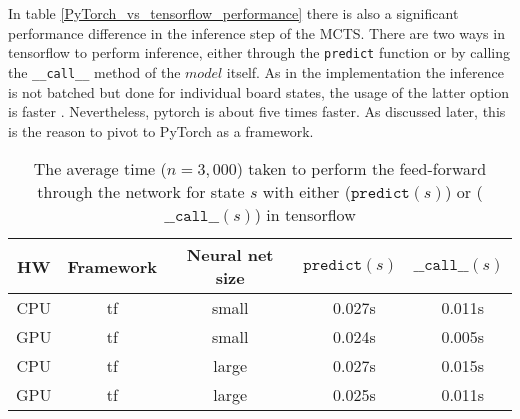 In table \ref{PyTorch_vs_tensorflow_performance} there is also a significant performance difference in the inference step of the MCTS. There are two ways in tensorflow to perform inference, either through the \texttt{predict} function or by calling the \texttt{\_\_call\_\_} method of the $model$ itself. As in the implementation the inference is not batched but done for individual board states, the usage of the latter option is faster \cite{noauthor_tfkerasmodel_nodate}. Nevertheless, pytorch is about five times faster. As discussed later, this is the reason to pivot to PyTorch as a framework.

\begin{table*}
    \begin{center}
        \begin{tabular}{ c|c|c|c|c }
            HW  & Framework & Neural net size & $\texttt{predict}(s)$ & $\texttt{\_\_call\_\_}(s)$ \\
            \hline
            \hline
            CPU & tf        & small           & ~0.027s               & ~0.011s                    \\
            GPU & tf        & small           & ~0.024s               & ~0.005s                    \\
            CPU & tf        & large           & ~0.027s               & ~0.015s                    \\
            GPU & tf        & large           & ~0.025s               & ~0.011s                    \\
        \end{tabular}
    \end{center}
    \caption{The average time ($n = 3,000$) taken to perform the feed-forward through the network for state $s$ with either ($\texttt{predict}(s)$) or ($\texttt{\_\_call\_\_}(s)$) in tensorflow}\label{tensorflow_predict_vs_call}
\end{table*}

